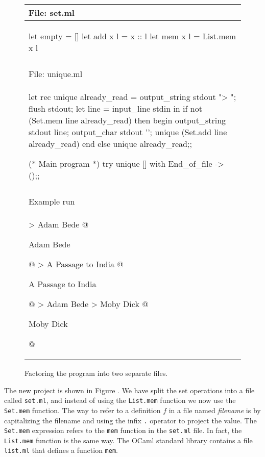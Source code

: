 \begin{figure}
\begin{center}
\begin{tabular}[t]{l}
File: set.ml\\
\hline
\begin{ocamllisting}
let empty = []
let add x l = x :: l
let mem x l = List.mem x l
\end{ocamllisting}
\\
\\
File: unique.ml\\
\hline
\begin{ocamllisting}
let rec unique already_read =
    output_string stdout "> ";
    flush stdout;
    let line = input_line stdin in
        if not (Set.mem line already_read) then begin
           output_string stdout line;
           output_char stdout '\n';
           unique (Set.add line already_read)
        end else
           unique already_read;;

(* Main program *)
try unique [] with
   End_of_file ->
      ();;
\end{ocamllisting}
\\
\\
Example run\\
\hline
\begin{minipage}{4in}
\begin{ocaml}
> Adam Bede
@
\begin{topoutput}
Adam Bede
\end{topoutput}
@
> A Passage to India
@
\begin{topoutput}
A Passage to India
\end{topoutput}
@
> Adam Bede
> Moby Dick
@
\begin{topoutput}
Moby Dick
\end{topoutput}
@
\end{ocaml}
\end{minipage}
\end{tabular}
\end{center}
\caption{Factoring the program into two separate files.}
\end{figure}
%
 The new project is shown in Figure . We have split
the set operations into a file called \hbox{\lstinline/set.ml/}, and instead of using the
\hbox{\lstinline/List.mem/} function we now use the \hbox{\lstinline/Set.mem/} function.  The way to
refer to a definition \ensuremath{f} in a file named \emph{filename} is by capitalizing the filename
and using the infix \hbox{\lstinline/./} operator to project the value. The
\hbox{\lstinline/Set.mem/} expression refers to the \hbox{\lstinline/mem/} function in the
\hbox{\lstinline/set.ml/} file. In fact, the \hbox{\lstinline/List.mem/} function is the same
way. The OCaml standard library contains a file \hbox{\lstinline/list.ml/} that defines a function
\hbox{\lstinline/mem/}.

